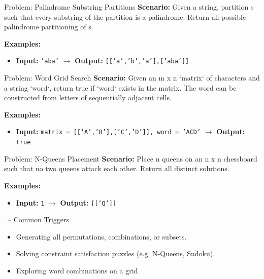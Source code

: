\begin{frame}[fragile]{Problem: Palindrome Substring Partitions}
  \textbf{Scenario:}
  Given a string, partition s such that every substring of the partition is a palindrome. Return all possible palindrome partitioning of s.
  
  \vspace{0.3cm}
  \textbf{Examples:}
  \begin{itemize}
    \item \textbf{Input:} \texttt{'aba'} $\rightarrow$ \textbf{Output:} \texttt{[['a','b','a'],['aba']]}
  \end{itemize}
\end{frame}

\begin{frame}[fragile]{Problem: Word Grid Search}
  \textbf{Scenario:}
  Given an m x n `matrix` of characters and a string `word`, return true if `word` exists in the matrix. The word can be constructed from letters of sequentially adjacent cells.
  
  \vspace{0.3cm}
  \textbf{Examples:}
  \begin{itemize}
    \item \textbf{Input:} \texttt{matrix = [['A','B'],['C','D']], word = 'ACD'} $\rightarrow$ \textbf{Output:} \texttt{true}
  \end{itemize}
\end{frame}

\begin{frame}[fragile]{Problem: N-Queens Placement}
  \textbf{Scenario:}
  Place n queens on an n x n chessboard such that no two queens attack each other. Return all distinct solutions.
  
  \vspace{0.3cm}
  \textbf{Examples:}
  \begin{itemize}
    \item \textbf{Input:} \texttt{1} $\rightarrow$ \textbf{Output:} \texttt{[['Q']]}
  \end{itemize}
\end{frame}

\begin{frame}{\secname\ -- Common Triggers}
  \begin{itemize}
    \item Generating all permutations, combinations, or subsets.
        \item Solving constraint satisfaction puzzles (e.g. N-Queens, Sudoku).
        \item Exploring word combinations on a grid.
  \end{itemize}
\end{frame}
